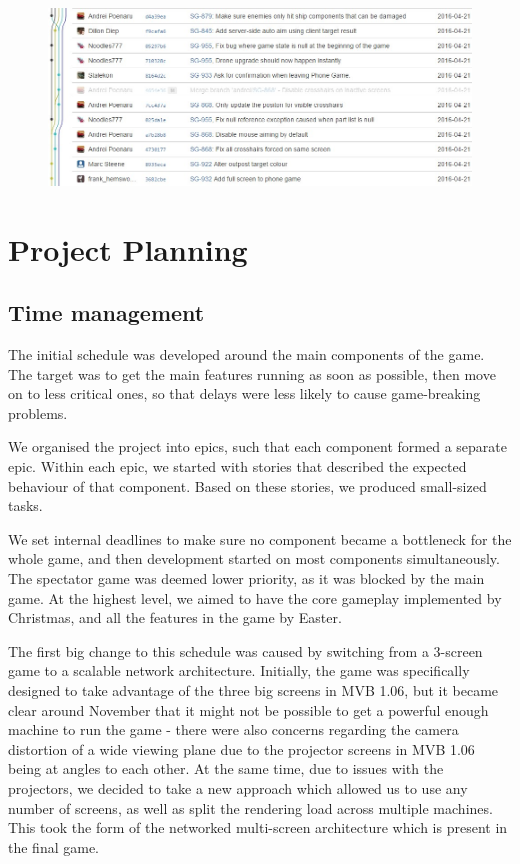 \documentclass[a4paper,11pt]{article}
\begin{document}
\begin{figure}[ht]
	\centering
    \includegraphics[keepaspectratio,width=.9\textwidth]{bitbucket}
    \label{fig:bitbucket}
\end{figure}

\section{Project Planning}

\subsection{Time management}
The initial schedule was developed around the main components of the game. The target was to get the main features running as soon as possible, then move on to less critical ones, so that delays were less likely to cause game-breaking problems.

We organised the project into epics, such that each component formed a separate epic. Within each epic, we started with stories that described the expected behaviour of that component. Based on these stories, we produced small-sized tasks.

We set internal deadlines to make sure no component became a bottleneck for the whole game, and then development started on most components simultaneously. The spectator game was deemed lower priority, as it was blocked by the main game. At the highest level, we aimed to have the core gameplay implemented by Christmas, and all the features in the game by Easter.

The first big change to this schedule was caused by switching from a 3-screen game to a scalable network architecture. Initially, the game was specifically designed to take advantage of the three big screens in MVB 1.06, but it became clear around November that it might not be possible to get a powerful enough machine to run the game - there were also concerns regarding the camera distortion of a wide viewing plane due to the projector screens in MVB 1.06 being at angles to each other. At the same time, due to issues with the projectors, we decided to take a new approach which allowed us to use any number of screens, as well as split the rendering load across multiple machines. This took the form of the networked multi-screen architecture which is present in the final game.
\end{document}
